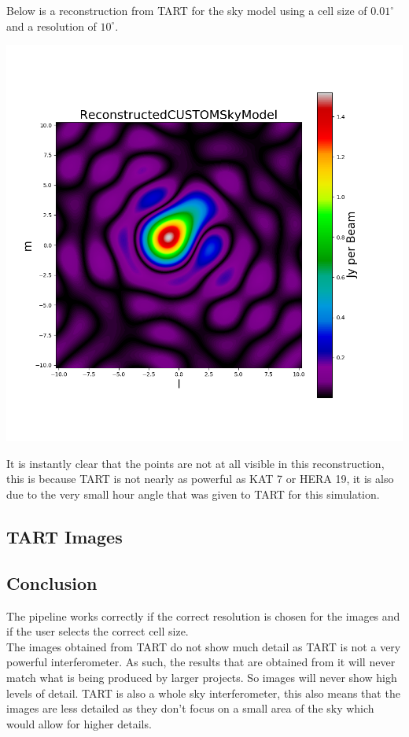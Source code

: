 Below is a reconstruction from TART for the sky model using a cell size of $0.01^\circ$ and a resolution of $10^\circ$. 
\begin{center}
    \includegraphics[scale=0.4]{images/RECON_TART_4_POINT.png}
\end{center}
It is instantly clear that the points are not at all visible in this reconstruction, this is because TART is not nearly as powerful as KAT 7 or HERA 19, it is also due to the very small hour angle that was given to TART for this simulation.

\subsection{TART Images}

\subsection{Conclusion}
The pipeline works correctly if the correct resolution is chosen for the images and if the user selects the correct cell size.\\
The images obtained from TART do not show much detail as TART is not a very powerful interferometer. As such, the results that are obtained from it will never match what is being produced by larger projects. So images will never show high levels of detail. TART is also a whole sky interferometer, this also means that the images are less detailed as they don't focus on a small area of the sky which would allow for higher details.

